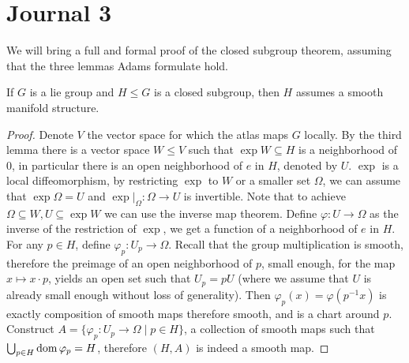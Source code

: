 \section{Journal 3}
We will bring a full and formal proof of the closed subgroup theorem, assuming that the three lemmas Adams formulate hold.
\begin{theorem}
	If $G$ is a lie group and $H \le G$ is a closed subgroup, then $H$ assumes a smooth manifold structure.
\end{theorem}
\begin{proof}
	Denote $V$ the vector space for which the atlas maps $G$ locally.
	By the third lemma there is a vector space $W \le V$ such that $\exp W \subseteq H$ is a neighborhood of $0$, in particular there is an open neighborhood of $e$ in $H$, denoted by $U$.
	$\exp$ is a local diffeomorphism, by restricting $\exp$ to $W$ or a smaller set $\Omega$, we can assume that $\exp \Omega = U$ and $\exp |_{\Omega} : \Omega \to U$ is invertible.
	Note that to achieve $\Omega \subseteq W, U \subseteq \exp W$ we can use the inverse map theorem.
	Define $\varphi : U \to \Omega$ as the inverse of the restriction of $\exp$, we get a function of a neighborhood of $e$ in $H$.
	For any $p \in H$, define $\varphi_p : U_p \to \Omega$. Recall that the group multiplication is smooth, therefore the preimage of an open neighborhood of $p$, small enough, for the map $x \mapsto x \cdot p$,
	yields an open set such that $U_p = p U$ (where we assume that $U$ is already small enough without loss of generality).
	Then $\varphi_p(x) = \varphi(p^{-1} x)$ is exactly composition of smooth maps therefore smooth, and is a chart around $p$.
	Construct $A = \{ \varphi_p : U_p \to \Omega \mid p \in H \}$, a collection of smooth maps such that $\bigcup_{p \in H} \operatorname{dom} \varphi_p = H$, therefore $(H, A)$ is indeed a smooth map.
\end{proof}


